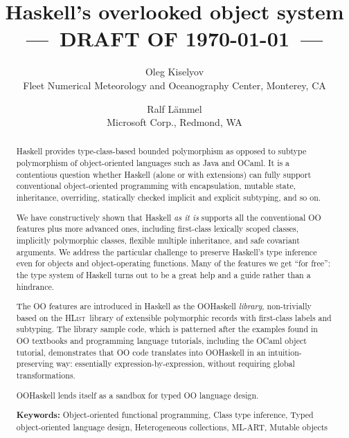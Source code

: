 \documentclass{jfp}
\newcommand{\HList}{\textsc{HList}}
\begin{document}
 
\title{Haskell's overlooked object system\\
{\normalsize ---~DRAFT OF \today~---}}

\author[O. Kiselyov and R. L{\"a}mmel]{Oleg Kiselyov\\%
Fleet Numerical Meteorology and Oceanography Center, Monterey, CA
\and
Ralf L{\"a}mmel\\Microsoft Corp., Redmond, WA}



\maketitle

\begin{abstract}

Haskell provides type-class-based bounded polymorphism as opposed to
subtype polymorphism of object-oriented languages such as Java and
OCaml. It is a contentious question whether Haskell (alone or with
extensions) can fully support conventional object-oriented programming
with encapsulation, mutable state, inheritance, overriding, statically
checked implicit and explicit subtyping, and so on.

We have constructively shown that Haskell \emph{as it is} supports all
the conventional OO features plus more advanced ones, including
first-class lexically scoped classes, implicitly polymorphic classes,
flexible multiple inheritance, and safe covariant arguments. 
We address the particular challenge
to preserve Haskell's type inference even for objects and
object-operating functions. Many of the features we get ``for free'':
the type system of Haskell turns out to be a great help and a guide
rather than a hindrance.

The OO features are introduced in Haskell as the OOHaskell
\emph{library}, non-trivially based on the \HList\ library of
extensible polymorphic records with first-class labels and
subtyping. The library sample code, which is patterned after the
examples found in OO textbooks and programming language tutorials,
including the OCaml object tutorial, demonstrates that OO code translates
into OOHaskell in an intuition-preserving way: essentially
expression-by-expression, without requiring global transformations.

OOHaskell lends itself as a sandbox for typed OO language design.

\medskip

\noindent
\textbf{Keywords:} Object-oriented functional programming, Class type
inference, Typed object-oriented language design, Heterogeneous
collections, ML-ART, Mutable objects

\end{abstract}
\end{document}
